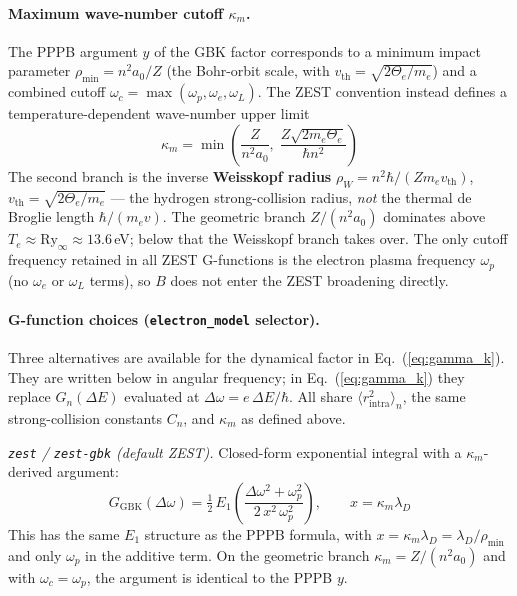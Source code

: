 \documentclass[11pt,a4paper]{article}
\numberwithin{equation}{section}
\begin{document}
\paragraph{Maximum wave-number cutoff $\kappa_m$.}
The PPPB argument $y$ of the GBK factor corresponds to a minimum impact parameter
$\rho_\mathrm{min} = n^2 a_0/Z$ (the Bohr-orbit scale, with $v_\mathrm{th}=\sqrt{2\Theta_e/m_e}$) and a combined cutoff $\omega_c = \max(\omega_p, \omega_e, \omega_L)$.  The ZEST convention
instead defines a temperature-dependent wave-number upper limit
\begin{equation}
\label{eq:kappa_m}
\kappa_m = \min\!\left(\frac{Z}{n^2 a_0},\;\frac{Z\sqrt{2m_e \Theta_e}}{\hbar n^2}\right)
\end{equation}
The second branch is the inverse \textbf{Weisskopf radius} $\rho_W = n^2\hbar/(Zm_ev_\mathrm{th})$,
$v_\mathrm{th}=\sqrt{2\Theta_e/m_e}$ — the hydrogen strong-collision radius, \emph{not} the thermal de Broglie
length $\hbar/(m_ev)$.  The geometric branch $Z/(n^2 a_0)$ dominates above $T_e \approx \mathrm{Ry}_\infty \approx 13.6$\,eV;
below that the Weisskopf branch takes over.  The only cutoff frequency retained in
all ZEST G-functions is the electron plasma frequency $\omega_p$ (no $\omega_e$ or $\omega_L$
terms), so $B$ does not enter the ZEST broadening directly.

\paragraph{G-function choices (\texttt{electron\_model} selector).}
Three alternatives are available for the dynamical factor in Eq.~(\ref{eq:gamma_k}).
They are written below in angular frequency; in Eq.~(\ref{eq:gamma_k}) they replace
$G_n(\Delta E)$ evaluated at $\Delta\omega = e\,\Delta E/\hbar$. All share $\langle r^2_\mathrm{intra}\rangle_n$,
the same strong-collision constants $C_n$, and $\kappa_m$ as defined above.

\medskip
\textit{\texttt{zest} / \texttt{zest-gbk} (default ZEST).}
Closed-form exponential integral with a $\kappa_m$-derived argument:
\begin{equation}
\label{eq:G_zest_gbk}
G_\mathrm{GBK}(\Delta\omega) = \tfrac{1}{2}\,E_1\!\left(\frac{\Delta\omega^2 + \omega_p^2}{2\,x^2\,\omega_p^2}\right),
\qquad x = \kappa_m \lambda_D
\end{equation}
This has the same $E_1$ structure as the PPPB formula, with $x = \kappa_m\lambda_D = \lambda_D/\rho_\mathrm{min}$
and only $\omega_p$ in the additive term. On the geometric branch $\kappa_m = Z/(n^2a_0)$ and with
$\omega_c=\omega_p$, the argument is identical to the PPPB $y$.
\end{document}

